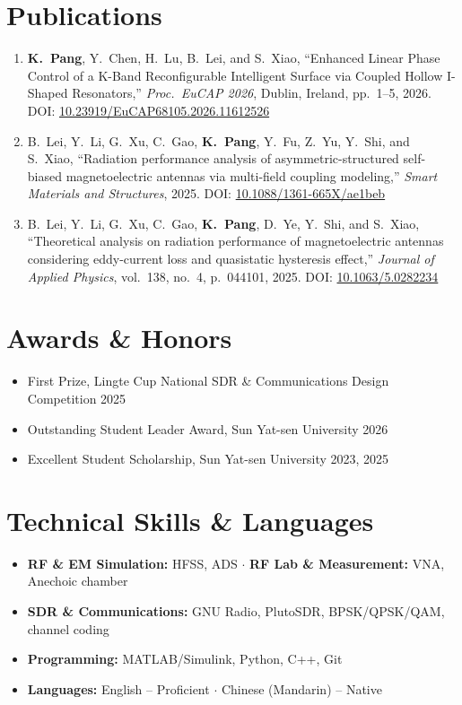 \documentclass[letterpaper,10pt]{article}
\begin{document}
\section{Publications}
\begin{enumerate}[leftmargin=1.5em,topsep=1pt,itemsep=0pt,parsep=0pt]
  \item \textbf{K.~Pang}, Y.~Chen, H.~Lu, B.~Lei, and S.~Xiao, ``Enhanced Linear Phase Control of a K-Band Reconfigurable Intelligent Surface via Coupled Hollow I-Shaped Resonators,'' \textit{Proc.\ EuCAP 2026}, Dublin, Ireland, pp.~1--5, 2026. DOI: \href{https://doi.org/10.23919/EuCAP68105.2026.11612526}{10.23919/EuCAP68105.2026.11612526}
  \item B.~Lei, Y.~Li, G.~Xu, C.~Gao, \textbf{K.~Pang}, Y.~Fu, Z.~Yu, Y.~Shi, and S.~Xiao, ``Radiation performance analysis of asymmetric-structured self-biased magnetoelectric antennas via multi-field coupling modeling,'' \textit{Smart Materials and Structures}, 2025. DOI: \href{https://doi.org/10.1088/1361-665X/ae1beb}{10.1088/1361-665X/ae1beb}
  \item B.~Lei, Y.~Li, G.~Xu, C.~Gao, \textbf{K.~Pang}, D.~Ye, Y.~Shi, and S.~Xiao, ``Theoretical analysis on radiation performance of magnetoelectric antennas considering eddy-current loss and quasistatic hysteresis effect,'' \textit{Journal of Applied Physics}, vol.~138, no.~4, p.~044101, 2025. DOI: \href{https://doi.org/10.1063/5.0282234}{10.1063/5.0282234}
\end{enumerate}

\section{Awards \& Honors}
\begin{itemize}
  \item First Prize, Lingte Cup National SDR \& Communications Design Competition \hfill 2025
  \item Outstanding Student Leader Award, Sun Yat-sen University \hfill 2026
  \item Excellent Student Scholarship, Sun Yat-sen University \hfill 2023, 2025
\end{itemize}

\section{Technical Skills \& Languages}
\begin{itemize}
  \item \textbf{RF \& EM Simulation:} HFSS, ADS $\cdot$ \textbf{RF Lab \& Measurement:} VNA, Anechoic chamber
  \item \textbf{SDR \& Communications:} GNU Radio, PlutoSDR, BPSK/QPSK/QAM, channel coding
  \item \textbf{Programming:} MATLAB/Simulink, Python, C++, Git
  \item \textbf{Languages:} English -- Proficient $\cdot$ Chinese (Mandarin) -- Native
\end{itemize}
\end{document}
